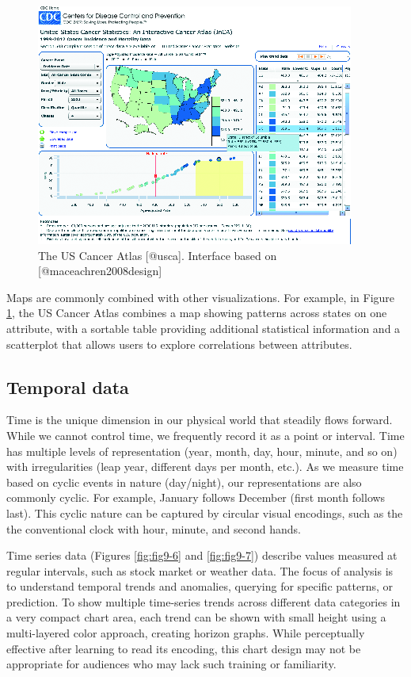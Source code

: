 \documentclass[]{krantz}
\begin{document}
\begin{figure}

{\centering \includegraphics[width=0.7\linewidth]{ChapterViz/figures/fig9-5} 

}

\caption{The US Cancer Atlas [@usca]. Interface based on [@maceachren2008design]}\label{fig:fig9-5}
\end{figure}

Maps are commonly combined with other visualizations. For example, in
Figure \ref{fig:fig9-5}, the US Cancer Atlas combines a map showing
patterns across states on one attribute, with a sortable table providing
additional statistical information and a scatterplot that allows users
to explore correlations between attributes.

\subsection{Temporal data}\label{sec:viz-2.4}

Time is the unique dimension in our physical world that steadily flows
forward. While we cannot control time, we frequently record it as a
point or interval. Time has multiple levels of representation (year,
month, day, hour, minute, and so on) with irregularities (leap year,
different days per month, etc.). As we measure time based on cyclic
events in nature (day/night), our representations are also commonly
cyclic. For example, January follows December (first month follows
last). This cyclic nature can be captured by circular visual encodings,
such as the the conventional clock with hour, minute, and second hands.

Time series data (Figures \ref{fig:fig9-6} and \ref{fig:fig9-7})
describe values measured at regular intervals, such as stock market or
weather data. The focus of analysis is to understand temporal trends and
anomalies, querying for specific patterns, or prediction. To show
multiple time-series trends across different data categories in a very
compact chart area, each trend can be shown with small height using a
multi-layered color approach, creating horizon graphs. While
perceptually effective after learning to read its encoding, this chart
design may not be appropriate for audiences who may lack such training
or familiarity.
\end{document}
